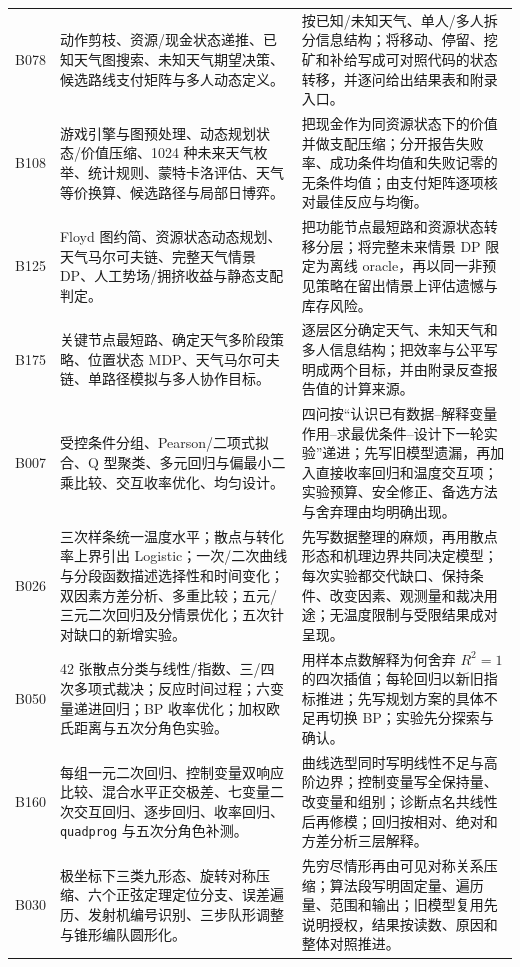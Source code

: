 \documentclass[UTF8,a4paper,12pt]{ctexart}
\begin{document}
\begin{longtable}{p{1.4cm}p{5.2cm}p{7.0cm}}
B078 & 动作剪枝、资源/现金状态递推、已知天气图搜索、未知天气期望决策、候选路线支付矩阵与多人动态定义。 &
按已知/未知天气、单人/多人拆分信息结构；将移动、停留、挖矿和补给写成可对照代码的状态转移，并逐问给出结果表和附录入口。\\
B108 & 游戏引擎与图预处理、动态规划状态/价值压缩、1024 种未来天气枚举、统计规则、蒙特卡洛评估、天气等价换算、候选路径与局部日博弈。 &
把现金作为同资源状态下的价值并做支配压缩；分开报告失败率、成功条件均值和失败记零的无条件均值；由支付矩阵逐项核对最佳反应与均衡。\\
B125 & Floyd 图约简、资源状态动态规划、天气马尔可夫链、完整天气情景 DP、人工势场/拥挤收益与静态支配判定。 &
把功能节点最短路和资源状态转移分层；将完整未来情景 DP 限定为离线 oracle，再以同一非预见策略在留出情景上评估遗憾与库存风险。\\
B175 & 关键节点最短路、确定天气多阶段策略、位置状态 MDP、天气马尔可夫链、单路径模拟与多人协作目标。 &
逐层区分确定天气、未知天气和多人信息结构；把效率与公平写明成两个目标，并由附录反查报告值的计算来源。\\
B007 & 受控条件分组、Pearson/二项式拟合、Q 型聚类、多元回归与偏最小二乘比较、交互收率优化、均匀设计。 &
四问按“认识已有数据--解释变量作用--求最优条件--设计下一轮实验”递进；先写旧模型遗漏，再加入直接收率回归和温度交互项；实验预算、安全修正、备选方法与舍弃理由均明确出现。\\
B026 & 三次样条统一温度水平；散点与转化率上界引出 Logistic；一次/二次曲线与分段函数描述选择性和时间变化；双因素方差分析、多重比较；五元/三元二次回归及分情景优化；五次针对缺口的新增实验。 &
先写数据整理的麻烦，再用散点形态和机理边界共同决定模型；每次实验都交代缺口、保持条件、改变因素、观测量和裁决用途；无温度限制与受限结果成对呈现。\\
B050 & 42 张散点分类与线性/指数、三/四次多项式裁决；反应时间过程；六变量递进回归；BP 收率优化；加权欧氏距离与五次分角色实验。 &
用样本点数解释为何舍弃 $R^2=1$ 的四次插值；每轮回归以新旧指标推进；先写规划方案的具体不足再切换 BP；实验先分探索与确认。\\
B160 & 每组一元二次回归、控制变量双响应比较、混合水平正交极差、七变量二次交互回归、逐步回归、收率回归、\texttt{quadprog} 与五次分角色补测。 &
曲线选型同时写明线性不足与高阶边界；控制变量写全保持量、改变量和组别；诊断点名共线性后再修模；回归按相对、绝对和方差分析三层解释。\\
B030 & 极坐标下三类九形态、旋转对称压缩、六个正弦定理定位分支、误差遍历、发射机编号识别、三步队形调整与锥形编队圆形化。 &
先穷尽情形再由可见对称关系压缩；算法段写明固定量、遍历量、范围和输出；旧模型复用先说明授权，结果按读数、原因和整体对照推进。\\

\end{longtable}
\end{document}
